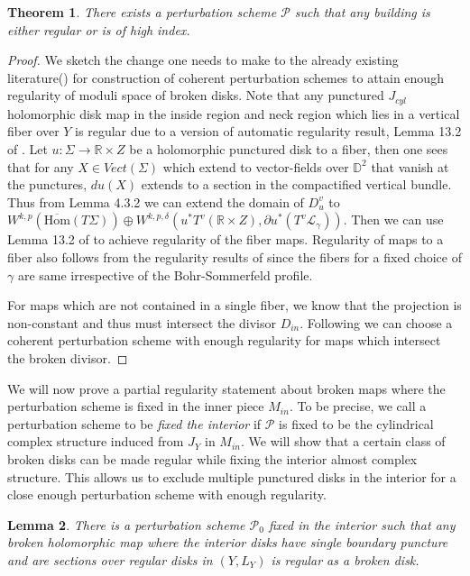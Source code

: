 \documentclass[11pt, oneside,dvipsnames]{amsart}
\renewcommand{\to}{\rightarrow}
\newcommand{\Hom}{\text{Hom}}
\renewcommand{\to}{\rightarrow}
\newcommand{\<}{\langle}
\renewcommand{\>}{\rangle}
\newcommand{\inn}{{in}}
\newcommand{\bD}{\mathbb{D}}
\newcommand{\bR}{\mathbb{R}}
\newcommand{\cL}{\mathcal{L}}
\newcommand{\cP}{\mathcal{P}}
\renewcommand{\to}{\rightarrow}
\newtheorem{Theorem}{Theorem}[section]
\newtheorem{lemma}[Theorem]{Lemma}
\theoremstyle{definition}
\theoremstyle{definition}
\numberwithin{equation}{subsection}
\begin{document}
\begin{Theorem}\label{thm:regularity}
    There exists a perturbation scheme $\cP$ such that any building is either regular or is of high index.
\end{Theorem}
\begin{proof}
We sketch the change one needs to make to the already existing literature(\cite{floflip,PW19}) for construction of coherent perturbation schemes to attain enough regularity of moduli space of broken disks. Note that any punctured $J_{cyl}$ holomorphic disk map in the inside region and neck region which lies in a vertical fiber over $Y$ is regular due to a version of automatic regularity result, Lemma 13.2 of \cite{seidelFuk}. Let $u:\Sigma \to \bR \times Z$ be a holomorphic punctured disk to a fiber, then one sees that for any $X\in Vect(\Sigma)$ which extend to vector-fields over $\bD^2$ that vanish at the punctures, $du(X)$ extends to a section in the compactified vertical bundle. Thus from Lemma 4.3.2 \cite{JholoWendl} we can extend the domain of $D_u^v$ to $W^{k,p}(\overline{\Hom}(T\Sigma)) \oplus W^{k,p,\delta}(u^*T^v(\bR \times Z),\partial u^*(T^v \cL_\gamma)).$ Then we can use Lemma 13.2 of \cite{seidelFuk} to achieve regularity of the fiber maps. Regularity of maps to a fiber also follows from the regularity results of \cite[\S 5.1]{Cha23} since the fibers for a fixed choice of $\gamma$ are same irrespective of the Bohr-Sommerfeld profile.


For maps which are not contained in a single fiber, we know that the projection is non-constant and thus must intersect the divisor $D_\inn$. Following \cite{cwstab,floflip} we can choose a coherent perturbation scheme with enough regularity for maps which intersect the broken divisor.
\end{proof}


We will now prove a partial regularity statement about broken maps where the perturbation scheme is fixed in the inner piece $M_\inn.$ To be precise, we call a perturbation scheme to be \textit{fixed the interior}  if $\cP$ is fixed to be the cylindrical complex structure induced from $J_Y$ in $M_\inn.$ We will show that a certain class of broken disks can be made regular while fixing the interior almost complex structure. This allows us to exclude multiple punctured disks in the interior for a close enough perturbation scheme with enough regularity.

\begin{lemma}\label{lemm:fixedininterior}
    There is a perturbation scheme $\cP_0$ fixed in the interior such that any broken holomorphic map where the interior disks have single boundary puncture and are sections over regular disks in $(Y,L_Y)$ is regular as a broken disk.
\end{lemma}
\end{document}
